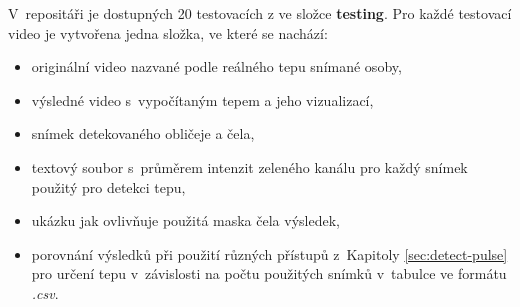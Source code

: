 \documentclass[
  digital, %
  table,   %
%
  lof,     %
  lot,     %
]{fithesis3}
\begin{document}
V~repositáři je dostupných 20 testovacích z ve složce \textbf{testing}. Pro každé testovací video je vytvořena jedna složka, ve které se nachází:
  \begin{itemize} 
      \item{originální video nazvané podle reálného tepu snímané osoby,}
        \item{výsledné video s~vypočítaným tepem a jeho vizualizací,}
      \item{snímek detekovaného obličeje a čela,}
        \item{textový soubor s~průměrem intenzit zeleného kanálu pro každý snímek použitý pro detekci tepu,}
        \item{ukázku jak ovlivňuje použitá maska čela výsledek,}
        \item{porovnání výsledků při použití různých přístupů z~Kapitoly \ref{sec:detect-pulse} pro určení tepu v~závislosti na počtu použitých snímků v~tabulce ve formátu \emph{.csv}.}
    \end{itemize}
\end{document}

